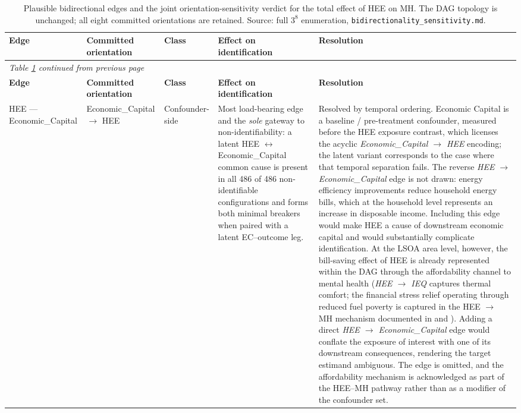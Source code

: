 \begin{longtable}{@{}p{1.9cm}p{1.9cm}p{1.4cm}p{2.7cm}p{4.9cm}@{}}
\caption{Plausible bidirectional edges and the joint orientation-sensitivity verdict for the total effect of HEE on MH. The DAG topology is unchanged; all eight committed orientations are retained. Source: full $3^{8}$ enumeration, \texttt{bidirectionality\_sensitivity.md}.}
\label{tab:bidirectional-edges}\\
\toprule
\textbf{Edge} & \textbf{Committed orientation} & \textbf{Class} & \textbf{Effect on identification} & \textbf{Resolution} \\
\midrule
\endfirsthead
\multicolumn{5}{l}{\textit{Table \ref{tab:bidirectional-edges} continued from previous page}}\\
\toprule
\textbf{Edge} & \textbf{Committed orientation} & \textbf{Class} & \textbf{Effect on identification} & \textbf{Resolution} \\
\midrule
\endhead
\bottomrule
\endfoot
HEE --- Economic\_Capital & Economic\_Capital $\to$ HEE & Confounder-side & Most load-bearing edge and the \emph{sole} gateway to non-identifiability: a latent HEE $\leftrightarrow$ Economic\_Capital common cause is present in all 486 of 486 non-identifiable configurations and forms both minimal breakers when paired with a latent EC--outcome leg. & Resolved by temporal ordering. Economic Capital is a baseline / pre-treatment confounder, measured before the HEE exposure contrast, which licenses the acyclic \textit{Economic\_Capital $\to$ HEE} encoding; the latent variant corresponds to the case where that temporal separation fails. The reverse \textit{HEE $\to$ Economic\_Capital} edge is not drawn: energy efficiency improvements reduce household energy bills, which at the household level represents an increase in disposable income. Including this edge would make HEE a cause of downstream economic capital and would substantially complicate identification. At the LSOA area level, however, the bill-saving effect of HEE is already represented within the DAG through the affordability channel to mental health (\textit{HEE $\to$ IEQ} captures thermal comfort; the financial stress relief operating through reduced fuel poverty is captured in the HEE $\to$ MH mechanism documented in \citet{willand_towards_2015} and \citet{grey_short-term_2017}). Adding a direct \textit{HEE $\to$ Economic\_Capital} edge would conflate the exposure of interest with one of its downstream consequences, rendering the target estimand ambiguous. The edge is omitted, and the affordability mechanism is acknowledged as part of the HEE--MH pathway rather than as a modifier of the confounder set. \\

\end{longtable}
